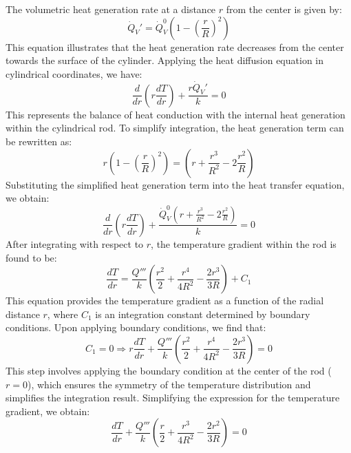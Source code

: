 \documentclass{article}
\numberwithin{equation}{section}
\begin{document}
The volumetric heat generation rate at a distance \(r\) from the center is given by:
\begin{equation}
\dot{Q}_V' = \dot{Q}_V^0 \left(1 - \left(\frac{r}{R}\right)^2\right)
\end{equation}
\noindent
This equation illustrates that the heat generation rate decreases from the center towards the surface of the cylinder. Applying the heat diffusion equation in cylindrical coordinates, we have:
\begin{equation}
\frac{d}{dr} \left(r \frac{dT}{dr}\right) + \frac{r \dot{Q}_V'}{k} = 0
\end{equation}
\noindent
This represents the balance of heat conduction with the internal heat generation within the cylindrical rod. To simplify integration, the heat generation term can be rewritten as:
\begin{equation}
r \left(1 - \left(\frac{r}{R}\right)^2\right) = \left(r + \frac{r^3}{R^2} - 2 \frac{r^2}{R}\right)
\end{equation}
\noindent
Substituting the simplified heat generation term into the heat transfer equation, we obtain:
\begin{equation}
\frac{d}{dr} \left(r \frac{dT}{dr}\right) + \frac{\dot{Q}_V^0 \left(r + \frac{r^3}{R^2} - 2 \frac{r^2}{R}\right)}{k} = 0
\end{equation}
\noindent
After integrating with respect to \(r\), the temperature gradient within the rod is found to be:
\begin{equation}
\frac{dT}{dr} = \frac{Q'''}{k} \left( \frac{r^2}{2} + \frac{r^4}{4R^2} - \frac{2r^3}{3R} \right) + C_1
\end{equation}
\noindent
This equation provides the temperature gradient as a function of the radial distance \(r\), where \(C_1\) is an integration constant determined by boundary conditions. Upon applying boundary conditions, we find that:
\begin{equation}
C_1 = 0 \Rightarrow r\frac{dT}{dr} + \frac{Q'''}{k} \left( \frac{r^2}{2} + \frac{r^4}{4R^2} - \frac{2r^3}{3R} \right) = 0
\end{equation}
\noindent
This step involves applying the boundary condition at the center of the rod (\(r=0\)), which ensures the symmetry of the temperature distribution and simplifies the integration result. Simplifying the expression for the temperature gradient, we obtain:
\begin{equation}
\frac{dT}{dr} + \frac{Q'''}{k} \left( \frac{r}{2} + \frac{r^3}{4R^2} - \frac{2r^2}{3R} \right) = 0
\end{equation}
\end{document}
